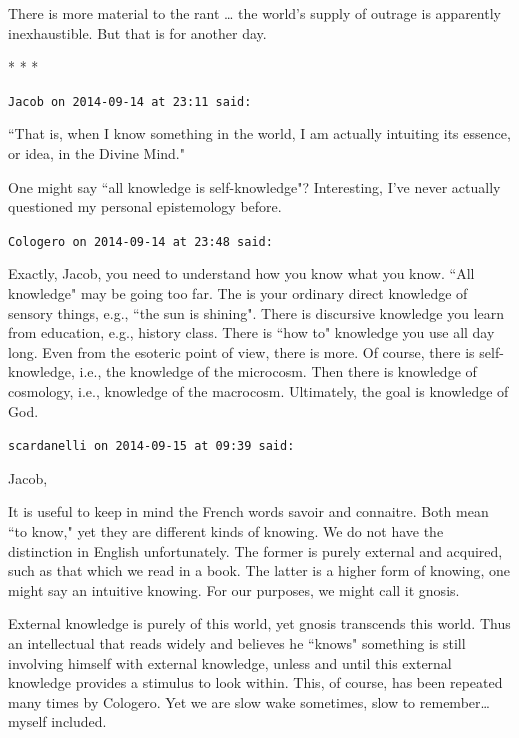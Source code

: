 There is more material to the rant … the world's supply of outrage is apparently inexhaustible. But that is for another day.




\begin{center}* * *\end{center}

\begin{footnotesize}\begin{sffamily}



\texttt{Jacob on 2014-09-14 at 23:11 said: }

``That is, when I know something in the world, I am actually intuiting its essence, or idea, in the Divine Mind."

One might say ``all knowledge is self-knowledge"? Interesting, I've never actually questioned my personal epistemology before.


\hfill

\texttt{Cologero on 2014-09-14 at 23:48 said: }

Exactly, Jacob, you need to understand how you know what you know. ``All knowledge" may be going too far. The is your ordinary direct knowledge of sensory things, e.g., ``the sun is shining". There is discursive knowledge you learn from education, e.g., history class. There is ``how to" knowledge you use all day long. Even from the esoteric point of view, there is more. Of course, there is self-knowledge, i.e., the knowledge of the microcosm. Then there is knowledge of cosmology, i.e., knowledge of the macrocosm. Ultimately, the goal is knowledge of God.


\hfill

\texttt{scardanelli on 2014-09-15 at 09:39 said: }

Jacob,

It is useful to keep in mind the French words savoir and connaitre. Both mean ``to know," yet they are different kinds of knowing. We do not have the distinction in English unfortunately. The former is purely external and acquired, such as that which we read in a book. The latter is a higher form of knowing, one might say an intuitive knowing. For our purposes, we might call it gnosis. 

External knowledge is purely of this world, yet gnosis transcends this world. Thus an intellectual that reads widely and believes he ``knows" something is still involving himself with external knowledge, unless and until this external knowledge provides a stimulus to look within. This, of course, has been repeated many times by Cologero. Yet we are slow wake sometimes, slow to remember…myself included.


\end{sffamily}
\end{footnotesize}
